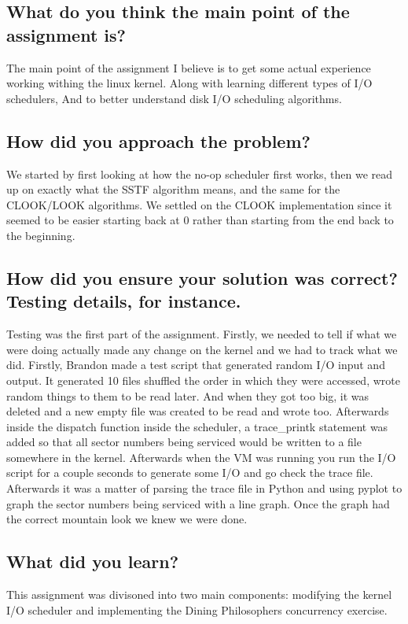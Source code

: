 \documentclass{article}
\begin{document}
    \subsection{What do you think the main point of the assignment is?}
    The main point of the assignment I believe is to get some actual experience working withing the linux kernel. Along with learning different types of I/O schedulers,  And to better understand disk I/O scheduling algorithms.

    \subsection{How did you approach the problem?}
    We started by first looking at how the no-op scheduler first works, then we read up on exactly what the SSTF algorithm means, and the same for the CLOOK/LOOK algorithms. We settled on the CLOOK implementation since it seemed to be easier starting back at 0 rather than starting from the end back to the beginning.
    \subsection{How did you ensure your solution was correct? Testing details, for instance.}
    Testing was the first part of the assignment. Firstly, we needed to tell if what we were doing actually made any change on the kernel and we had to track what we did. Firstly, Brandon made a test script that generated random I/O input and output. It generated 10 files shuffled the order in which they were accessed, wrote random things to them to be read later. And when they got too big, it was deleted and a new empty file was created to be read and wrote too. Afterwards inside the dispatch function inside the scheduler, a trace\_printk statement was added so that all sector numbers being serviced would be written to a file somewhere in the kernel. Afterwards when the VM was running you run the I/O script for a couple seconds to generate some I/O and go check the trace file. Afterwards it was a matter of parsing the trace file in Python and using pyplot to graph the sector numbers being serviced with a line graph. Once the graph had the correct mountain look we knew we were done.

    \subsection{What did you learn?}
    This assignment was divisoned into two main components: modifying the kernel I/O scheduler and implementing the Dining Philosophers concurrency exercise.
\end{document}
